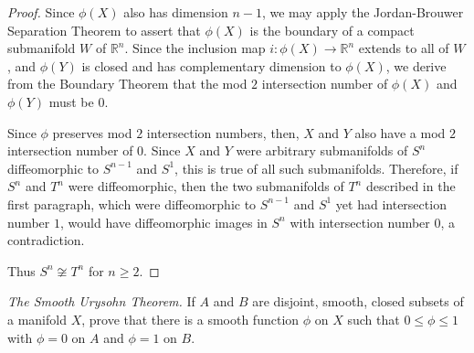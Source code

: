 \documentclass[12pt]{article}
\newcommand{\R}{\mathbb{R}}
\newenvironment{exercise}[2][Exercise]{\begin{trivlist}
\item[\hskip \labelsep {\bfseries #1}\hskip \labelsep {\bfseries #2.}]}{\end{trivlist}}
\begin{document}
\begin{proof}
Since $\phi(X)$ also has dimension $n-1$, we may apply the Jordan-Brouwer Separation Theorem to assert that $\phi(X)$ is the boundary of a compact submanifold $W$ of $\R^n$.  Since the inclusion map $i:\phi(X) \rightarrow \R^n$ extends to all of $W$, and $\phi(Y)$ is closed and has complementary dimension to $\phi(X)$, we derive from the Boundary Theorem that the mod $2$ intersection number of $\phi(X)$ and $\phi(Y)$ must be $0$.

Since $\phi$ preserves mod $2$ intersection numbers, then, $X$ and $Y$ also have a mod $2$ intersection number of 0.  Since $X$ and $Y$ were arbitrary submanifolds of $S^n$ diffeomorphic to $S^{n-1}$ and $S^1$, this is true of all such submanifolds.  Therefore, if $S^n$ and $T^n$ were diffeomorphic, then the two submanifolds of $T^n$ described in the first paragraph, which were diffeomorphic to $S^{n-1}$ and $S^1$ yet had intersection number $1$, would have diffeomorphic images in $S^n$ with intersection number $0$, a contradiction.

Thus $S^n \not \cong T^n$ for $n \geq 2$.


\end{proof}

\begin{exercise}{2}

\emph{The Smooth Urysohn Theorem.} If $A$ and $B$ are disjoint, smooth, closed subsets of a manifold $X$, prove that there is a smooth function $\phi$ on $X$ such that $0 \leq \phi \leq 1$ with $\phi = 0$ on $A$ and $\phi = 1$ on $B$.

\end{exercise}
\end{document}
